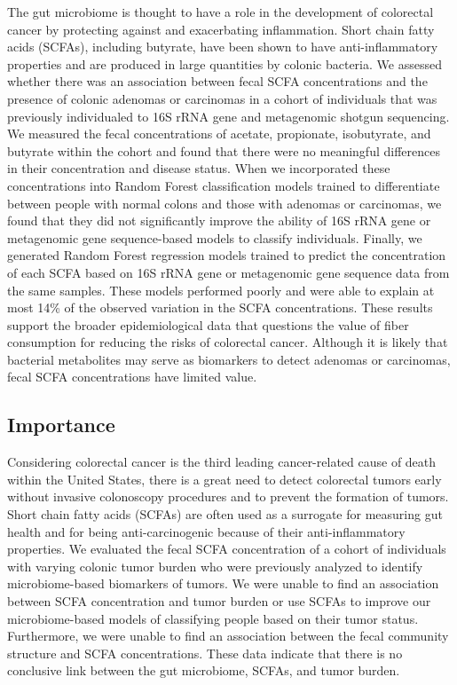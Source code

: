 \documentclass[11pt,]{article}
\begin{document}
The gut microbiome is thought to have a role in the development of
colorectal cancer by protecting against and exacerbating inflammation.
Short chain fatty acids (SCFAs), including butyrate, have been shown to
have anti-inflammatory properties and are produced in large quantities
by colonic bacteria. We assessed whether there was an association
between fecal SCFA concentrations and the presence of colonic adenomas
or carcinomas in a cohort of individuals that was previously
individualed to 16S rRNA gene and metagenomic shotgun sequencing. We
measured the fecal concentrations of acetate, propionate, isobutyrate,
and butyrate within the cohort and found that there were no meaningful
differences in their concentration and disease status. When we
incorporated these concentrations into Random Forest classification
models trained to differentiate between people with normal colons and
those with adenomas or carcinomas, we found that they did not
significantly improve the ability of 16S rRNA gene or metagenomic gene
sequence-based models to classify individuals. Finally, we generated
Random Forest regression models trained to predict the concentration of
each SCFA based on 16S rRNA gene or metagenomic gene sequence data from
the same samples. These models performed poorly and were able to explain
at most 14\% of the observed variation in the SCFA concentrations. These
results support the broader epidemiological data that questions the
value of fiber consumption for reducing the risks of colorectal cancer.
Although it is likely that bacterial metabolites may serve as biomarkers
to detect adenomas or carcinomas, fecal SCFA concentrations have limited
value.

\newpage

\hypertarget{importance}{%
\subsection{Importance}\label{importance}}

Considering colorectal cancer is the third leading cancer-related cause
of death within the United States, there is a great need to detect
colorectal tumors early without invasive colonoscopy procedures and to
prevent the formation of tumors. Short chain fatty acids (SCFAs) are
often used as a surrogate for measuring gut health and for being
anti-carcinogenic because of their anti-inflammatory properties. We
evaluated the fecal SCFA concentration of a cohort of individuals with
varying colonic tumor burden who were previously analyzed to identify
microbiome-based biomarkers of tumors. We were unable to find an
association between SCFA concentration and tumor burden or use SCFAs to
improve our microbiome-based models of classifying people based on their
tumor status. Furthermore, we were unable to find an association between
the fecal community structure and SCFA concentrations. These data
indicate that there is no conclusive link between the gut microbiome,
SCFAs, and tumor burden.
\end{document}
